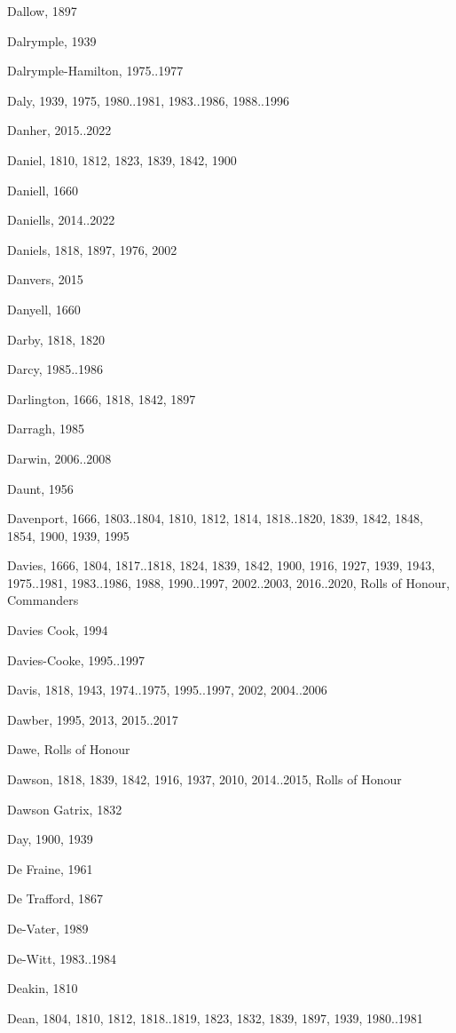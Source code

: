 {\begin{theindex}
\item Dallow, 1897
\item Dalrymple, 1939
\item Dalrymple-Hamilton, 1975..1977
\item Daly, 1939, 1975, 1980..1981, 1983..1986, 1988..1996
\item Danher, 2015..2022
\item Daniel, 1810, 1812, 1823, 1839, 1842, 1900
\item Daniell, 1660
\item Daniells, 2014..2022
\item Daniels, 1818, 1897, 1976, 2002
\item Danvers, 2015
\item Danyell, 1660
\item Darby, 1818, 1820
\item Darcy, 1985..1986
\item Darlington, 1666, 1818, 1842, 1897
\item Darragh, 1985
\item Darwin, 2006..2008
\item Daunt, 1956
\item Davenport, 1666, 1803..1804, 1810, 1812, 1814, 1818..1820, 1839, 1842, 1848, 1854, 1900, 1939, 1995
\item Davies, 1666, 1804, 1817..1818, 1824, 1839, 1842, 1900, 1916, 1927, 1939, 1943, 1975..1981, 1983..1986, 1988, 1990..1997, 2002..2003, 2016..2020, Rolls of Honour, Commanders
\item Davies Cook, 1994
\item Davies-Cooke, 1995..1997
\item Davis, 1818, 1943, 1974..1975, 1995..1997, 2002, 2004..2006
\item Dawber, 1995, 2013, 2015..2017
\item Dawe, Rolls of Honour
\item Dawson, 1818, 1839, 1842, 1916, 1937, 2010, 2014..2015, Rolls of Honour
\item Dawson Gatrix, 1832
\item Day, 1900, 1939
\item De Fraine, 1961
\item De Trafford, 1867
\item De-Vater, 1989
\item De-Witt, 1983..1984
\item Deakin, 1810
\item Dean, 1804, 1810, 1812, 1818..1819, 1823, 1832, 1839, 1897, 1939, 1980..1981

\end{theindex}}
